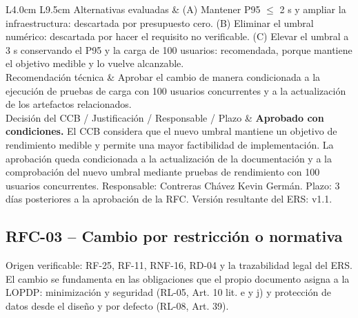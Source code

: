 \documentclass[journal,onecolumn]{IEEEtran}
\begin{document}
\begin{longtable}{L{4.0cm} L{9.5cm}}
		\addlinespace
		Alternativas evaluadas &
		(A) Mantener P95 $\leq$ 2 s y ampliar la infraestructura: descartada por presupuesto cero.
		(B) Eliminar el umbral numérico: descartada por hacer el requisito no verificable.
		(C) Elevar el umbral a 3 s conservando el P95 y la carga de 100 usuarios: recomendada, porque
		mantiene el objetivo medible y lo vuelve alcanzable. \\
		\addlinespace
		Recomendación técnica &
		Aprobar el cambio de manera condicionada a la ejecución de pruebas de carga con 100 usuarios
		concurrentes y a la actualización de los artefactos relacionados. \\
		\addlinespace
		Decisión del CCB / Justificación / Responsable / Plazo &
		\textbf{Aprobado con condiciones.} El CCB considera que el nuevo umbral mantiene un objetivo
		de rendimiento medible y permite una mayor factibilidad de implementación. La aprobación queda
		condicionada a la actualización de la documentación y a la comprobación del nuevo umbral
		mediante pruebas de rendimiento con 100 usuarios concurrentes. Responsable: Contreras Chávez
		Kevin Germán. Plazo: 3 días posteriores a la aprobación de la RFC. Versión resultante del ERS:
		v1.1. \\
	\end{longtable}
	
	\subsection{RFC-03 -- Cambio por restricción o normativa}
	
	Origen verificable: RF-25, RF-11, RNF-16, RD-04 y la trazabilidad legal del ERS. El cambio se
	fundamenta en las obligaciones que el propio documento asigna a la LOPDP: minimización y seguridad
	(RL-05, Art. 10 lit. e y j) y protección de datos desde el diseño y por defecto (RL-08, Art. 39).
	
\end{document}

